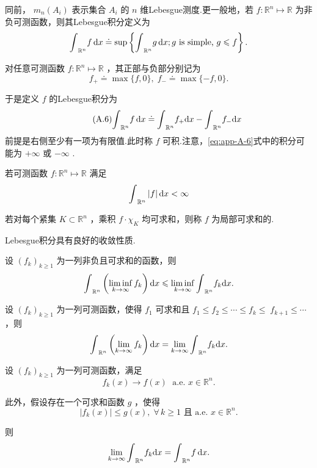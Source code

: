同前， ${m}_{n}\left( {A}_{i}\right)$ 表示集合 ${A}_{i}$ 的 $n$ 维Lebesgue测度.更一般地，若 $f : {\mathbb{R}}^{n} \mapsto  \mathbb{R}$ 为非负可测函数，则其Lebesgue积分定义为
\[
{\int }_{{\mathbb{R}}^{n}}{f\mathop{}\!\mathrm{d} x} \doteq  \sup \left\{  {{\int }_{{\mathbb{R}}^{n}}{g\mathop{}\!\mathrm{d} x};g\text{ is simple, }g \leqslant  f}\right\}  .
\]

对任意可测函数 $f : {\mathbb{R}}^{n} \mapsto  \mathbb{R}$ ，其正部与负部分别记为
\[
{f}_{ + } \doteq  \max \{ f,0\} ,\;{f}_{ - } \doteq  \max \{  - f,0\} .
\]

于是定义 $f$ 的Lebesgue积分为
\begin{equation}\tag{A.6}\label{eq:app-A-6}
{\int }_{{\mathbb{R}}^{n}}{f\mathop{}\!\mathrm{d} x} \doteq  {\int }_{{\mathbb{R}}^{n}}{f}_{ + }{\mathop{}\!\mathrm{d} x} - {\int }_{{\mathbb{R}}^{n}}{f}_{ - }{\mathop{}\!\mathrm{d} x}
\end{equation}
前提是右侧至少有一项为有限值.此时称 $f$ 可积.注意，\eqref{eq:app-A-6}式中的积分可能为 $+ \infty$ 或 $- \infty$ .

若可测函数 $f : {\mathbb{R}}^{n} \mapsto  \mathbb{R}$ 满足
\[
{\int }_{{\mathbb{R}}^{n}}\left| f\right| {\mathop{}\!\mathrm{d} x} < \infty
\]

若对每个紧集 $K \subset  {\mathbb{R}}^{n}$ ，乘积 $f \cdot  {\chi }_{K}$ 均可求和，则称 $f$ 为局部可求和的.

Lebesgue积分具有良好的收敛性质.

\begin{theorem}[Fatou引理]\label{thm:app-A-8}
设 ${\left( {f}_{k}\right) }_{k \geq  1}$ 为一列非负且可求和的函数，则
\[
{\int }_{{\mathbb{R}}^{n}}\left( {\mathop{\liminf }\limits_{{k \rightarrow  \infty }}{f}_{k}}\right) {\mathop{}\!\mathrm{d} x} \leqslant  \mathop{\liminf }\limits_{{k \rightarrow  \infty }}{\int }_{{\mathbb{R}}^{n}}{f}_{k}{\mathop{}\!\mathrm{d} x}.
\]
\end{theorem}

\begin{theorem}[单调收敛定理]\label{thm:app-A-9}
设 ${\left( {f}_{k}\right) }_{k \geq  1}$ 为一列可测函数，使得 ${f}_{1}$ 可求和且 ${f}_{1} \leq  {f}_{2} \leq  \cdots  \leq  {f}_{k} \leq \; {f}_{k + 1} \leq  \cdots$ ，则
\[
{\int }_{{\mathbb{R}}^{n}}\left( {\mathop{\lim }\limits_{{k \rightarrow  \infty }}{f}_{k}}\right) {\mathop{}\!\mathrm{d} x} = \mathop{\lim }\limits_{{k \rightarrow  \infty }}{\int }_{{\mathbb{R}}^{n}}{f}_{k}{\mathop{}\!\mathrm{d} x}.
\]
\end{theorem}

\begin{theorem}[Lebesgue控制收敛定理]\label{thm:app-A-10}
设 ${\left( {f}_{k}\right) }_{k \geq  1}$ 为一列可测函数，满足
\[
{f}_{k}\left( x\right)  \rightarrow  f\left( x\right) \;\text{ a.e. }x \in  {\mathbb{R}}^{n}.
\]

此外，假设存在一个可求和函数 $g$ ，使得
\[
\left| {{f}_{k}\left( x\right) }\right|  \leq  g\left( x\right),\;\forall\,k \geq  1\text{ 且 a.e. }x \in  {\mathbb{R}}^{n}.
\]

则
\[
\mathop{\lim }\limits_{{k \rightarrow  \infty }}{\int }_{{\mathbb{R}}^{n}}{f}_{k}{\mathop{}\!\mathrm{d} x} = {\int }_{{\mathbb{R}}^{n}}{f\mathop{}\!\mathrm{d} x}.
\]
\end{theorem}

